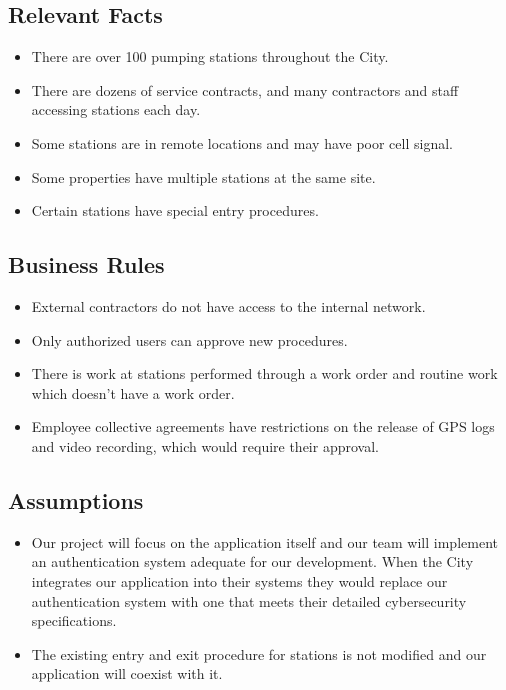 \documentclass[12pt]{article}
\begin{document}
\subsection{Relevant Facts}
\begin{itemize}
    \item There are over 100 pumping stations throughout the City.
    \item There are dozens of service contracts, and many contractors
    and staff accessing stations each day.
    \item Some stations are in remote locations and may have poor cell signal.
    \item Some properties have multiple stations at the same site.
    \item Certain stations have special entry procedures.
\end{itemize}

\subsection{Business Rules}
\begin{itemize}
    \item External contractors do not have access to the internal network.
    \item Only authorized users can approve new procedures. 
    \item There is work at stations performed through a work order
    and routine work which doesn't have a work order.
    \item Employee collective agreements have restrictions on the release of
    GPS logs and video recording, which would require their approval.
\end{itemize}
\subsection{Assumptions}
\begin{itemize}
    \item Our project will focus on the application itself
    and our team will implement an authentication system adequate for our
    development. When the City integrates our application into their systems 
    they would replace our authentication system with one that meets their 
    detailed cybersecurity specifications.
    \item The existing entry and exit procedure for stations is not modified
    and our application will coexist with it.
\end{itemize}
\end{document}
